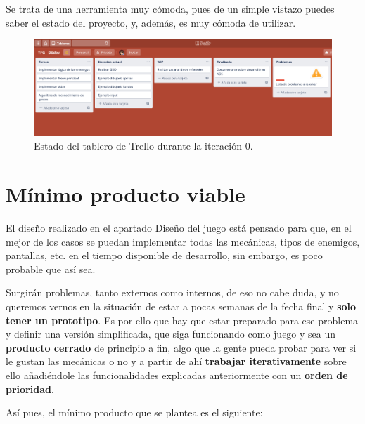   \vspace{0.5cm}
 
 Se trata de una herramienta muy cómoda, pues de un simple vistazo puedes saber el estado del proyecto, y, además, es muy cómoda de utilizar.

  \vspace{0.5cm}
  
  \begin{figure}[htbp]
\centering
  \includegraphics[width=1\textwidth]{archivos/trello.png}
  \caption{Estado del tablero de Trello durante la iteración 0.}
  \label{fig:trello}
\end{figure}

 
\section{Mínimo producto viable}

El diseño realizado en el apartado Diseño del juego está pensado para que, en el mejor de los casos se puedan implementar todas las mecánicas, tipos de enemigos, pantallas, etc. en el tiempo disponible de desarrollo, sin embargo, es poco probable que así sea.

\vspace{0.5cm}

Surgirán problemas, tanto externos como internos, de eso no cabe duda, y no queremos vernos en la situación de estar a pocas semanas de la fecha final y \textbf{solo tener un prototipo}. Es por ello que hay que estar preparado para ese problema y definir una versión simplificada, que siga funcionando como juego y sea un \textbf{producto cerrado} de principio a fin, algo que la gente pueda probar para ver si le gustan las mecánicas o no y a partir de ahí \textbf{trabajar iterativamente} sobre ello añadiéndole las funcionalidades explicadas anteriormente con un \textbf{orden de prioridad}.

\vspace{0.5cm}

Así pues, el mínimo producto que se plantea es el siguiente:

